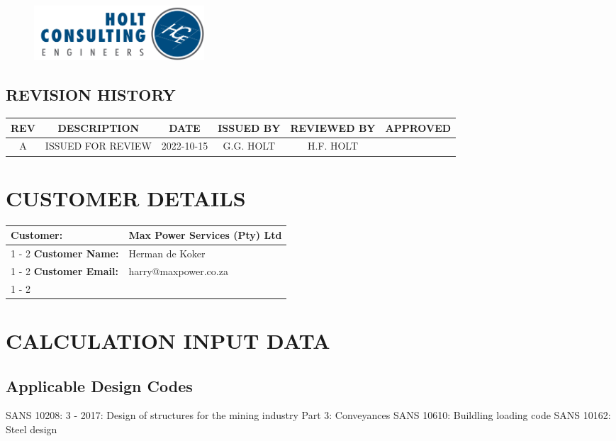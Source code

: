 \documentclass{article}%
\begin{document}
\begin{figure}[h!]%
\includegraphics[width=240px]{HCE.jpg}%
\centering%
\end{figure}

%
\newpage%
\begin{center}%
\section*{REVISION HISTORY}%
\label{sec:REVISIONHISTORY}%

%
\begin{minipage}{\textwidth}%
\centering%
\begin{tabular}{|c |c |c |c |c |c |}%
\hline%
\textbf{REV}&\textbf{DESCRIPTION}&\textbf{DATE}&\textbf{ISSUED BY}&\textbf{REVIEWED BY}&\textbf{APPROVED}\\%
\hline%
A&ISSUED FOR REVIEW&2022{-}10{-}15&G.G. HOLT&H.F. HOLT&\\%
\hline%
\end{tabular}%
\end{minipage}%
\end{center}%
\newpage%
\section{CUSTOMER DETAILS}%
\label{sec:CUSTOMERDETAILS}%
\begin{flushleft}%
\begin{minipage}{\textwidth}%
\centering%
\begin{tabular}{|l |l |}%
\hline%
\textbf{Customer:}&Max Power Services (Pty) Ltd\\%
\cline{1%
-%
2}%
\textbf{Customer Name:}&Herman de Koker\\%
\cline{1%
-%
2}%
\textbf{Customer Email:}&harry@maxpower.co.za\\%
\cline{1%
-%
2}%
\end{tabular}%
\end{minipage}%
\end{flushleft}

%
\newpage%
\section{CALCULATION INPUT DATA}%
\label{sec:CALCULATIONINPUTDATA}%
\subsection{Applicable Design Codes}%
\label{subsec:ApplicableDesignCodes}%
\begin{flushleft}%
SANS 10208: 3 {-} 2017: Design of structures for the mining industry Part 3: Conveyances%
\linebreak%
SANS 10610: Buildling loading code%
\linebreak%
SANS 10162: Steel design%
\linebreak%
\end{flushleft}
\end{document}
